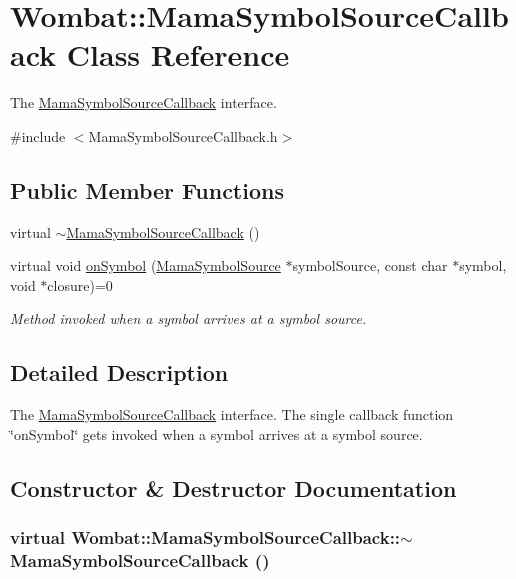\hypertarget{classWombat_1_1MamaSymbolSourceCallback}{
\section{Wombat::MamaSymbolSourceCallback Class Reference}
\label{classWombat_1_1MamaSymbolSourceCallback}
}


The \hyperlink{classWombat_1_1MamaSymbolSourceCallback}{MamaSymbolSourceCallback} interface.  


{\ttfamily \#include $<$MamaSymbolSourceCallback.h$>$}\subsection*{Public Member Functions}
\begin{DoxyCompactItemize}
\item 
virtual \hyperlink{classWombat_1_1MamaSymbolSourceCallback_a7a7af10c8cc9ba7d0e11b750dc4782c5}{$\sim$MamaSymbolSourceCallback} ()
\item 
virtual void \hyperlink{classWombat_1_1MamaSymbolSourceCallback_aff08844362e9cbad87320610ee25c8f8}{onSymbol} (\hyperlink{classWombat_1_1MamaSymbolSource}{MamaSymbolSource} $\ast$symbolSource, const char $\ast$symbol, void $\ast$closure)=0
\begin{DoxyCompactList}\small\item\em Method invoked when a symbol arrives at a symbol source. \item\end{DoxyCompactList}\end{DoxyCompactItemize}


\subsection{Detailed Description}
The \hyperlink{classWombat_1_1MamaSymbolSourceCallback}{MamaSymbolSourceCallback} interface. The single callback function \char`\"{}onSymbol\char`\"{} gets invoked when a symbol arrives at a symbol source. 

\subsection{Constructor \& Destructor Documentation}
\hypertarget{classWombat_1_1MamaSymbolSourceCallback_a7a7af10c8cc9ba7d0e11b750dc4782c5}{
\subsubsection[{$\sim$MamaSymbolSourceCallback}]{\setlength{\rightskip}{0pt plus 5cm}virtual Wombat::MamaSymbolSourceCallback::$\sim$MamaSymbolSourceCallback ()}}
\label{classWombat_1_1MamaSymbolSourceCallback_a7a7af10c8cc9ba7d0e11b750dc4782c5}



